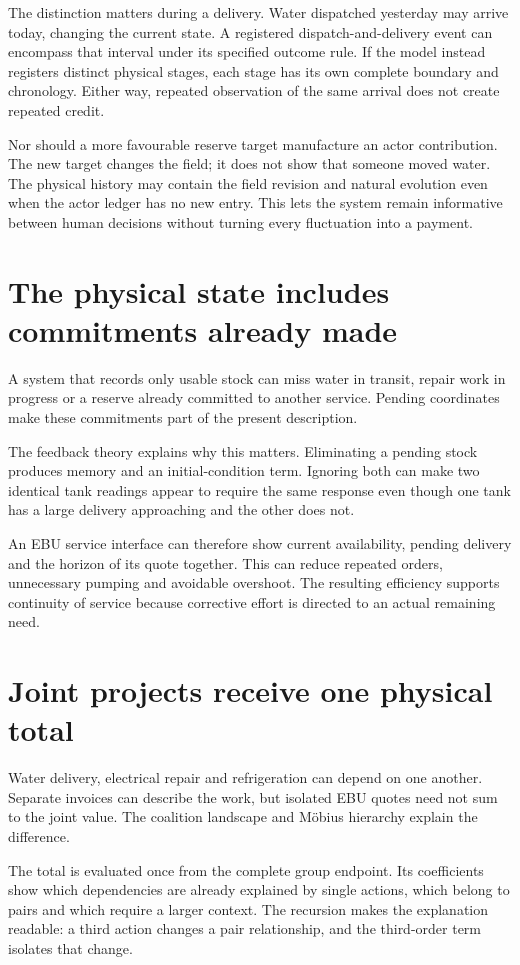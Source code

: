 The distinction matters during a delivery. Water dispatched yesterday may arrive today, changing the current state. A registered dispatch-and-delivery event can encompass that interval under its specified outcome rule. If the model instead registers distinct physical stages, each stage has its own complete boundary and chronology. Either way, repeated observation of the same arrival does not create repeated credit.

Nor should a more favourable reserve target manufacture an actor contribution. The new target changes the field; it does not show that someone moved water. The physical history may contain the field revision and natural evolution even when the actor ledger has no new entry. This lets the system remain informative between human decisions without turning every fluctuation into a payment.

\section{The physical state includes commitments already made}
A system that records only usable stock can miss water in transit, repair work in progress or a reserve already committed to another service. Pending coordinates make these commitments part of the present description.

The feedback theory explains why this matters. Eliminating a pending stock produces memory and an initial-condition term. Ignoring both can make two identical tank readings appear to require the same response even though one tank has a large delivery approaching and the other does not.

An EBU service interface can therefore show current availability, pending delivery and the horizon of its quote together. This can reduce repeated orders, unnecessary pumping and avoidable overshoot. The resulting efficiency supports continuity of service because corrective effort is directed to an actual remaining need.

\section{Joint projects receive one physical total}
Water delivery, electrical repair and refrigeration can depend on one another. Separate invoices can describe the work, but isolated EBU quotes need not sum to the joint value. The coalition landscape and Möbius hierarchy explain the difference.

The total is evaluated once from the complete group endpoint. Its coefficients show which dependencies are already explained by single actions, which belong to pairs and which require a larger context. The recursion makes the explanation readable: a third action changes a pair relationship, and the third-order term isolates that change.

